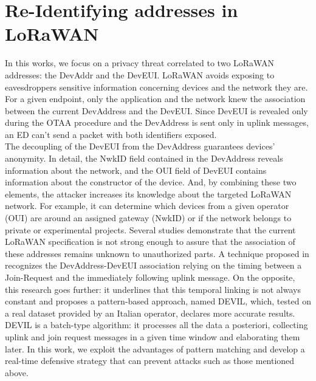 \section{Re-Identifying addresses in LoRaWAN}
\label{address_identification}
In this works, we focus on a privacy threat correlated to two LoRaWAN addresses: the DevAddr and the DevEUI. LoRaWAN avoids exposing to eavesdroppers sensitive information concerning devices and the network they are. For a given endpoint, only the application and the network knew the association between the current DevAddress and the DevEUI. Since DevEUI is revealed only during the OTAA procedure and the DevAddress is sent only in uplink messages, an ED can't send a packet with both identifiers exposed.
\\
The decoupling of the DevEUI from the DevAddress guarantees devices' anonymity. In detail, the NwkID field contained in the DevAddress reveals information about the network, and the OUI field of DevEUI contains information about the constructor of the device. And, by combining these two elements, the attacker increases its knowledge about the targeted LoRaWAN network. For example, it can determine which devices from a given operator (OUI) are around an assigned gateway (NwkID) or if the network belongs to private or experimental projects. Several studies demonstrate that the current LoRaWAN specification is not strong enough to assure that the association of these addresses remains unknown to unauthorized parts. A technique proposed in \cite{tech2020} recognizes the DevAddress-DevEUI association relying on the timing between a Join-Request and the immediately following uplink message. On the opposite, this research \cite{devil} goes further: it underlines that this temporal linking is not always constant and proposes a pattern-based approach, named DEVIL, which, tested on a real dataset provided by an Italian operator, declares more accurate results. DEVIL is a batch-type algorithm: it processes all the data a posteriori, collecting uplink and join request messages in a given time window and elaborating them later. In this work, we exploit the advantages of pattern matching and develop a real-time defensive strategy that can prevent attacks such as those mentioned above.